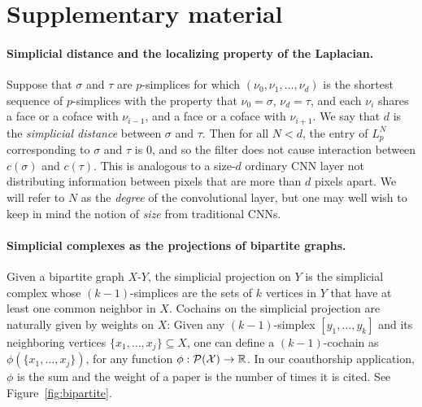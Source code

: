 \section{Supplementary material}

\paragraph{Simplicial distance and the localizing property of the Laplacian.}
Suppose that $\sigma$ and $\tau$ are $p$-simplices for which $(\nu_0, \nu_1, \dotsc, \nu_d)$ is the shortest sequence of $p$-simplices with the property that $\nu_0=\sigma$, $\nu_d=\tau$, and each $\nu_i$ shares a face or a coface with $\nu_{i-1}$, and a face or a coface with $\nu_{i+1}$. We say that $d$ is the \emph{simplicial distance} between $\sigma$ and $\tau$. Then for all $N<d$, the entry of $L_p^N$ corresponding to $\sigma$ and $\tau$ is $0$, and so the filter does not cause interaction between $c(\sigma)$ and $c(\tau)$. This is analogous to a size-$d$ ordinary CNN layer not distributing information between pixels that are more than $d$ pixels apart. We will refer to $N$ as the \emph{degree} of the convolutional layer, but one may well wish to keep in mind the notion of \emph{size} from traditional CNNs.

\paragraph{Simplicial complexes as the projections of bipartite graphs.}
Given a bipartite graph $X$-$Y$, the simplicial projection on $Y$ is the simplicial complex whose $(k-1)$-simplices are the sets of $k$ vertices in $Y$ that have at least one common neighbor in $X$.
Cochains on the simplicial projection are naturally given by weights on $X$: Given any $(k-1)$-simplex $[y_1,\dots,y_k]$ and its neighboring vertices $\{x_1,\dots,x_j\}\subseteq X$, one can define a $(k-1)$-cochain as $\phi(\{x_1,\dots,x_j\})$, for any function $\phi: \mathcal{P(X)}\to\mathbb{R}$.
In our coauthorship application, $\phi$ is the sum and the weight of a paper is the number of times it is cited.
See Figure~\ref{fig:bipartite}.

